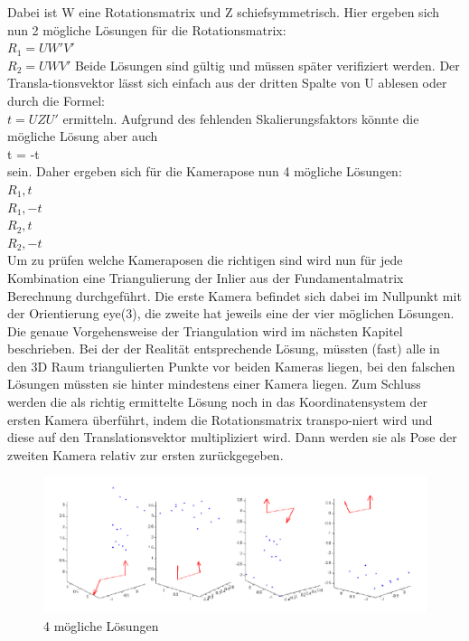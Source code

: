 Dabei ist W eine Rotationsmatrix und Z schiefsymmetrisch. Hier ergeben sich nun 2 mögliche Lösungen für die Rotationsmatrix:
\\
$R_1 = UW'V'$
\\
$R_2 = UWV'$
Beide Lösungen sind gültig und müssen später verifiziert werden. Der Transla-tionsvektor lässt sich einfach aus der dritten Spalte von U ablesen oder durch die Formel:
\\
$t = UZU'$
ermitteln. Aufgrund des fehlenden Skalierungsfaktors könnte die mögliche Lösung aber auch
\\
t = -t
\\
sein. Daher ergeben sich für die Kamerapose nun 4 mögliche Lösungen:
\\
$R_1, t$
\\
$R_1, -t$
\\
$R_2, t$
\\
$R_2, -t$
\\
Um zu prüfen welche Kameraposen die richtigen sind wird nun für jede Kombination eine Triangulierung der Inlier aus der Fundamentalmatrix Berechnung durchgeführt. Die erste Kamera befindet sich dabei im Nullpunkt mit der Orientierung eye(3), die zweite hat jeweils eine der vier möglichen Lösungen. Die genaue Vorgehensweise der Triangulation wird im nächsten Kapitel beschrieben. Bei der der Realität entsprechende Lösung, müssten (fast) alle in den 3D Raum triangulierten Punkte vor beiden Kameras liegen, bei den falschen Lösungen müssten sie hinter mindestens einer Kamera liegen. Zum Schluss werden die als richtig ermittelte Lösung noch in das Koordinatensystem der ersten Kamera überführt, indem die Rotationsmatrix transpo-niert wird und diese auf den Translationsvektor multipliziert wird. Dann werden sie als Pose der zweiten Kamera relativ zur ersten zurückgegeben. \cite{Richard2000} \cite{LTH2013}
\begin{figure}[ht]
    \centering
    \includegraphics[scale=0.6]{Figures/validierungDerLoesungen.PNG}
    \caption{4 mögliche Lösungen \cite{LTH2013}}
\end{figure}

